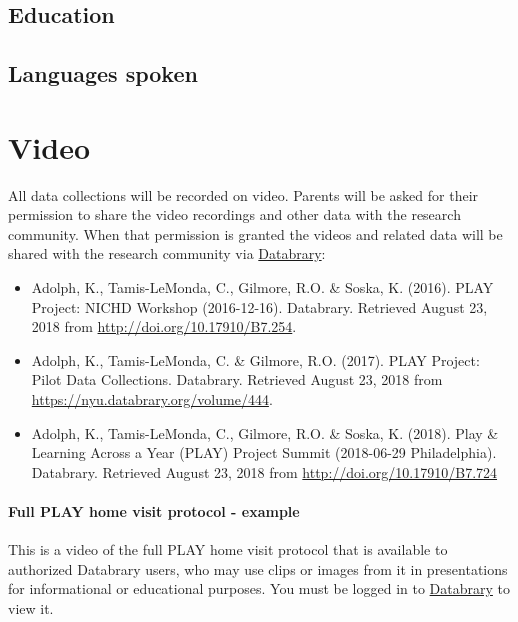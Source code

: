 \documentclass[
  12pt,
]{book}
\providecommand{\tightlist}{%
  \setlength{\itemsep}{0pt}\setlength{\parskip}{0pt}}
\begin{document}
\hypertarget{education}{%
\subsection{Education}\label{education}}

\hypertarget{languages-spoken}{%
\subsection{Languages spoken}\label{languages-spoken}}

\hypertarget{video-1}{%
\section{Video}\label{video-1}}

All data collections will be recorded on video.
Parents will be asked for their permission to share the video recordings and other data with the research community.
When that permission is granted the videos and related data will be shared with the research community via \href{http://databrary.org}{Databrary}:

\begin{itemize}
\tightlist
\item
  Adolph, K., Tamis-LeMonda, C., Gilmore, R.O. \& Soska, K. (2016). PLAY Project: NICHD Workshop (2016-12-16). Databrary. Retrieved August 23, 2018 from \url{http://doi.org/10.17910/B7.254}.
\item
  Adolph, K., Tamis-LeMonda, C. \& Gilmore, R.O. (2017). PLAY Project: Pilot Data Collections. Databrary. Retrieved August 23, 2018 from \url{https://nyu.databrary.org/volume/444}.
\item
  Adolph, K., Tamis-LeMonda, C., Gilmore, R.O. \& Soska, K. (2018). Play \& Learning Across a Year (PLAY) Project Summit (2018-06-29 Philadelphia). Databrary. Retrieved August 23, 2018 from \url{http://doi.org/10.17910/B7.724}
\end{itemize}

\hypertarget{full-play-home-visit-protocol---example}{%
\paragraph{Full PLAY home visit protocol - example}\label{full-play-home-visit-protocol---example}}

This is a video of the full PLAY home visit protocol that is available to authorized Databrary users, who may use clips or images from it in presentations for informational or educational purposes. You must be logged in to \href{http://databrary.org}{Databrary} to view it.
\end{document}
